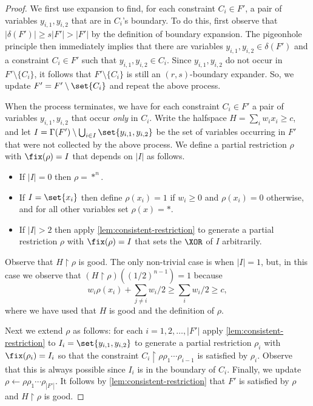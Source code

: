\documentclass{toc}
\begin{document}
\begin{proof}
	We first use expansion to find, for each constraint $C_i \in F'$, a pair of variables $y_{i,1}, y_{i,2}$ that are in $C_i$'s boundary. To do this, first observe that $|\delta(F')| \geq s |F'| > |F'|$ by the definition of boundary expansion.
	The pigeonhole principle then immediately implies that there are variables $y_{i,1}, y_{i,2} \in \delta(F')$ and a constraint $C_i \in F'$ such that $y_{i,1}, y_{i,2} \in C_i$. 
	Since $y_{i,1},y_{i,2}$ do not occur in $F' \setminus \{C_i\}$, it follows that $F' \setminus \{C_i\}$ is still an $(r, s)$-boundary expander. 
	So, we update $F' = F' \setminus \set{C_i}$ and repeat the above process.

	When the process terminates, we have for each constraint $C_i \in F'$ a pair of variables $y_{i,1}, y_{i,2}$ that occur \emph{only} in $C_i$.
	Write the halfspace $H = \sum_{i} w_i x_i \geq c$, and let $I = \Gamma(F') \setminus \bigcup_{i \in I} \set{y_{i,1}, y_{i,2}}$ be the set of variables occurring in $F'$ that were not collected by the above process.
	We define a partial restriction $\rho$ with $\fix(\rho) = I$ that depends on $|I|$ as follows.	
	\begin{itemize}
		\item If $|I| = 0$ then $\rho = *^n$.
		\item If $I = \set{x_i}$ then define $\rho(x_i) = 1$ if $w_i \geq 0$ and $\rho(x_i) = 0$ otherwise, and for all other variables set $\rho(x) = *$.
		\item If $|I| > 2$ then apply \autoref{lem:consistent-restriction} to generate a partial restriction $\rho$ with $\fix(\rho) = I$ that sets the $\XOR$ of $I$ arbitrarily.
	\end{itemize}
	Observe that $H \restriction \rho$ is good.
	The only non-trivial case is when $|I| = 1$, but, in this case we observe that $(H \restriction \rho)((1/2)^{n-1}) = 1$ because  
	 \[ w_i \rho(x_i) + \sum_{j \neq i} w_i/2 \geq \sum_{i} w_i/2 \geq c,\]
	where we have used that $H$ is good and the definition of $\rho$.

	Next we extend $\rho$ as follows: for each $i = 1, 2, \ldots, |F'|$ apply \autoref{lem:consistent-restriction} to $I_i = \set{y_{i,1}, y_{i,2}}$ to generate a partial restriction $\rho_i$ with $\fix(\rho_i) = I_i$ so that the constraint $C_i \restriction \rho \rho_1 \cdots \rho_{i-1}$ is satisfied by $\rho_i$.
	Observe that this is always possible since $I_i$ is in the boundary of $C_i$.
	Finally, we update $\rho \leftarrow \rho \rho_1 \cdots \rho_{|F'|}$.
	It follows by \autoref{lem:consistent-restriction} that $F'$ is satisfied by $\rho$ and $H \restriction \rho$ is good.
\end{proof}
\end{document}
